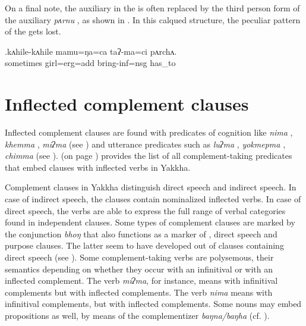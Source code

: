 On a final note, the auxiliary in the   is often replaced by the third person form of the  auxiliary \emph{pʌrnu} , as shown in \Next. In this calqued structure, the peculiar  pattern of the  gets lost.

\exg.kʌhile-kʌhile mamu=ŋa=ca  taʔ-ma=ci       pʌrchʌ.\\ 
sometimes girl{\sc =erg=add} bring-{\sc inf=nsg} {\sc has\_to}\\
 

 		
\section{Inflected complement clauses} \label{fin-comp}

Inflected complement clauses are found with predicates of  cognition like \emph{nima} , \emph{khemma} , \emph{miʔma}   (see ) and utterance predicates such as  \emph{luʔma} , \emph{yokmepma} , \emph{chim\-ma}  (see ).  (on page \pageref{overview-all}) provides the list of all complement-taking predicates that embed clauses with inflected verbs in Yakkha. 

Complement clauses in Yakkha distinguish direct speech and indirect speech. In case of indirect speech, the  clauses contain nominalized inflected verbs.  In case of direct speech, the verbs are able to express the full range of verbal categories found in independent clauses. Some types of complement clauses are marked by the conjunction \emph{bhoŋ} that also functions as a marker of ,  direct speech and purpose clauses. The latter seem to have developed out of clauses containing direct  speech (see ). Some complement-taking verbs are polysemous, their semantics depending on whether they occur with an infinitival or with an inflected complement. The verb \emph{miʔma}, for instance, means  with infinitival complements but  with inflected complements. The verb \emph{nima} means  with infinitival complements, but  with inflected complements. Some nouns may embed propositions  as well, by means of the complementizer \emph{baŋna/baŋha} (cf. ). 



